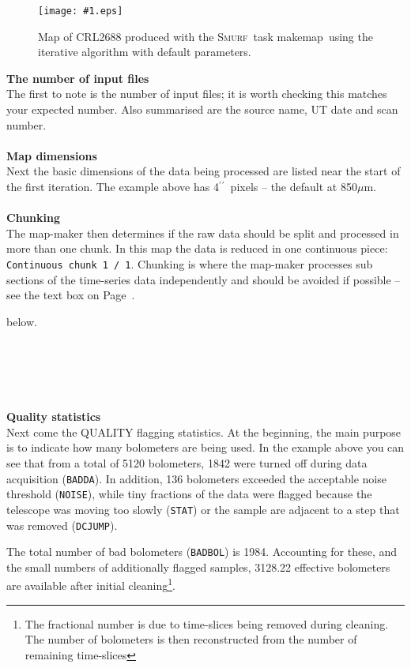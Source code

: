 \documentclass[twoside,11pt]{article}
\newcommand{\htmladdimg}[1]{}
\newenvironment{latexonly}{}{}
\newcommand{\xref}[3]{#1}
\renewcommand{\_}{\texttt{\symbol{95}}}
\newcommand{\myfig}[5]{
  \begin{figure}#2
    \centering\texttt{[image: \#1.eps]}
    \typeout{#1.eps inserted on page \arabic{page}}
    \caption{\label{#4}\small #5}
  \end{figure}
}
\newcommand{\myfig}[5]{
    \label{#4} \htmladdimg{#1.png}\\
    \\
    Figure: #5\\
  }
\newcommand{\arcmin}{\mbox{$^\prime$}}
\newcommand{\arcsec}{\arcmin\hspace*{-0.1em}\arcmin}
\newcommand{\smurf}{\xref{\textsc{Smurf}}{sun258}{}}
\newcommand{\task}[1]{\textsf{#1}}
\newcommand{\param}[1]{\texttt{#1}}
\newcommand{\makemap}{\xref{\task{makemap}}{sun258}{MAKEMAP}}
\begin{document}
\myfig{sc21_crl2688}{[t!]}{width=0.7\linewidth}{fig:itermap}{
  Map of CRL2688 produced with the \smurf\ task \makemap\ using
  the iterative algorithm with default parameters.}


\textbf{The number of input files}\\
The first to note is the number of input files; it is worth checking
this matches your expected number. Also summarised are the source
name, UT date and scan number.
\\ \\
\textbf{Map dimensions}\\
Next the basic dimensions of the data being processed are listed near
the start of the first iteration. The example above has 4\arcsec\ pixels
-- the default at 850$\mu$m.
\\ \\
\textbf{Chunking}\\
The map-maker then determines if the raw data should be split and
processed in more than one chunk. In this map the data is reduced in
one continuous piece: \param{Continuous chunk 1 / 1}. Chunking is
where the map-maker processes sub sections of the time-series data
independently and should be avoided if possible -- see the text box
\begin{latexonly}
on Page~\pageref{page:text}.
\end{latexonly}
\begin{htmlonly}
below.
\end{htmlonly}
\\

\begin{htmlonly}
 \htmladdimg{sc21_data_chunking.png}
 \\ \\
\end{htmlonly}


\textbf{Quality statistics}\\
Next come the QUALITY flagging statistics. At the beginning, the main
purpose is to indicate how many bolometers are being used. In the
example above you can see that from a total of 5120 bolometers, 1842
were turned off during data acquisition (\texttt{BADDA}). In addition,
136 bolometers exceeded the acceptable noise threshold
(\texttt{NOISE}), while tiny fractions of the data were flagged
because the telescope was moving too slowly (\texttt{STAT}) or the
sample are adjacent to a step that was removed (\texttt{DCJUMP}).

The total number of bad bolometers (\texttt{BADBOL}) is 1984.
Accounting for these, and the small numbers of additionally flagged
samples, 3128.22 effective bolometers are available after initial
cleaning\footnote{The fractional number is due to time-slices being
removed during cleaning. The number of bolometers is then
reconstructed from the number of remaining time-slices}.
\end{document}
